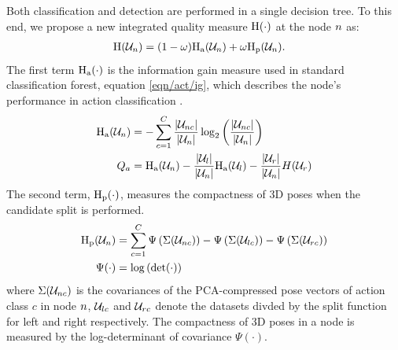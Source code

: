 Both classification and detection are performed in a single decision tree. To this end, we propose a new integrated quality measure $\mathrm{H}(\cdot)$ at the node $n$ as:
\begin{align}
	\label{eq/body/newquality}
	\mathrm{H}(\mathcal{U}_{n}) & = (1 - \omega)\mathrm{H_{a}}(\mathcal{U}_{n}) + \omega\mathrm{H_{p}}(\mathcal{U}_{n}). 
\end{align}
The first term $\mathrm{H_{a}}(\cdot)$ is the information gain measure used in standard classification forest, \cf equation \ref{eqn/act/ig}, which describes the node's performance in action classification \cite{Breiman2001}.  
\begin{equation}
	\label{eq/body/infogain}
	\begin{aligned}
		\mathrm{H_{a}}(\mathcal{U}_{n}) & = 
		- \displaystyle\sum_{c = 1}^{C} \frac{|\mathcal{U}_{n c}|}{|\mathcal{U}_{n}|}\log_{2}\left(\frac{|\mathcal{U}_{n c}|}{|\mathcal{U}_{n}|}\right)\\ 
		Q_{a} & = 
		\mathrm{H_{a}}(\mathcal{U}_{n}) - 
		\frac{|\mathcal{U}_{l}|}{|\mathcal{U}_{n}|} \mathrm{H_{a}}(\mathcal{U}_{l}) -  
		\frac{|\mathcal{U}_{r}|}{|\mathcal{U}_{n}|} H(\mathcal{U}_{r})  
	\end{aligned}
\end{equation}
The second term, $\mathrm{H_{p}}(\cdot)$, measures the compactness of 3D poses when the candidate split is performed.  
\begin{align}
	\mathrm{H_{p}}(\mathcal{U}_{n}) & = \displaystyle\sum_{c = 1}^{C} \Psi\left(\Sigma(\mathcal{U}_{n c})\right) - \Psi\left(\Sigma(\mathcal{U}_{lc})\right) 
- \Psi\left(\Sigma(\mathcal{U}_{rc})\right) \\ 
	\Psi(\cdot) & = \log\left(\det(\cdot)\right)
\end{align} 
where $\Sigma(\mathcal{U}_{n c})$ is the covariances of the PCA-compressed pose vectors of action class $c$ in node $n$, $\mathcal{U}_{lc}$ and $\mathcal{U}_{rc}$ denote the datasets divded by the split function for left and right respectively. The compactness of 3D poses in a node is measured by the log-determinant of covariance $\Psi(\cdot)$. 

